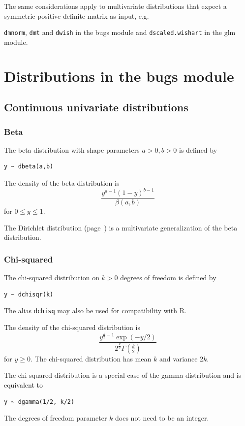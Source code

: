 \documentclass[11pt, a4paper, titlepage]{report}
\newcommand{\R}{\textsf{R}}
\begin{document}
The same considerations apply to multivariate distributions that
expect a symmetric positive definite matrix as input,
e.g. {\texttt{dmnorm}, \texttt{dmt} and \texttt{dwish} in the bugs
  module and \texttt{dscaled.wishart} in the glm module.

\section{Distributions in the bugs module}
\label{section:bugs:distributions}

\subsection{Continuous univariate distributions}

\subsubsection{Beta}
\label{bugs:dbeta}

The beta distribution with shape parameters $a > 0, b > 0$ is defined by
\begin{verbatim}
y ~ dbeta(a,b)
\end{verbatim}
The density of the beta distribution is
\[
\frac{\textstyle y^{a-1}(1-y)^{b-1}}{\textstyle \beta(a,b)}
\]
for $0 \leq y \leq 1$.

The Dirichlet distribution (page~\pageref{bugs:ddirch}) is a
multivariate generalization of the beta distribution.

\subsubsection{Chi-squared}
\label{bugs:dchisqr}

The chi-squared distribution on $k > 0$ degrees of freedom is defined by
\begin{verbatim}
y ~ dchisqr(k)
\end{verbatim}
The alias \texttt{dchisq} may also be used for compatibility with \R.

The density of the chi-squared distribution is
\[
\frac{\textstyle y^{\frac{k}{2} - 1} \exp(-y/2)}
     {\textstyle 2^{\frac{k}{2}} \Gamma({\scriptstyle \frac{k}{2}})}
\]
for $y \geq 0$. The chi-squared distribution has mean $k$ and variance $2k$.

The chi-squared distribution is a special case of the gamma
distribution and is equivalent to
\begin{verbatim}
y ~ dgamma(1/2, k/2)
\end{verbatim}
The degrees of freedom parameter $k$ does not need to be an integer.

}
\end{document}
